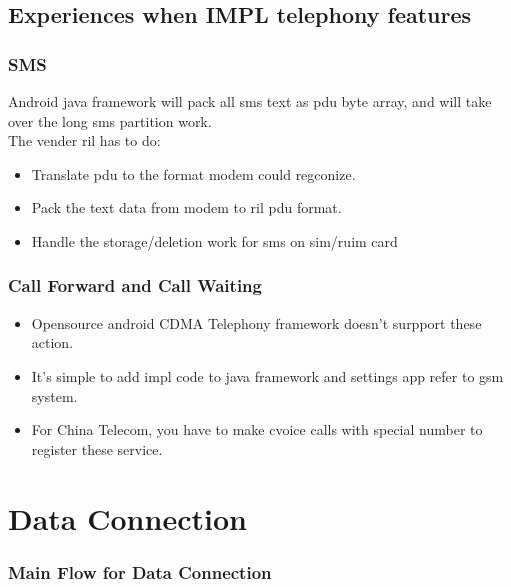 \documentclass{beamer}
\begin{document}
\subsection {Experiences when IMPL telephony features}

\begin{frame}
\frametitle{SMS}
Android java framework will pack all sms text as pdu byte array, and will take over the long sms partition work. \\
The vender ril has to do:
\begin{itemize}
    \item Translate pdu to the format modem could regconize.
    \item Pack the text data from modem to ril pdu format.
    \item Handle the storage/deletion work for sms on sim/ruim card
\end{itemize}
\end{frame}
\begin{frame}
    \frametitle{Call Forward and Call Waiting}
    \begin{itemize}
        \item Opensource android CDMA Telephony framework doesn't surpport these action.
        \item It's simple to add impl code to java framework and settings app refer to gsm system.
        \item For China Telecom, you have to make cvoice calls with special number to register these service.
    \end{itemize}
\end{frame}

\section{Data Connection}
\begin{frame}
    \frametitle{Main Flow for Data Connection}
\end{frame}
\end{document}
